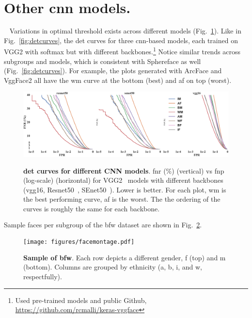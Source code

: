 %
\onecolumn
\renewcommand{\thesection}{\alph{section}}
\glsresetall
\setcounter{section}{0}

\section{Other \gls{cnn} models.}~\label{app:sec:other:models}
Variations in optimal threshold exists across different models (Fig.~\ref{fig:sdm-appendix-a}). Like in Fig.~\ref{fig:detcurves}, the \gls{det} curves for three \gls{cnn}-based models, each trained on VGG2 with softmax but with different backbones.\footnote{Used pre-trained models and public Github, \href{https://github.com/rcmalli/keras-vggface}{https://github.com/rcmalli/keras-vggface}} Notice similar trends across subgroups and models, which is consistent with  Sphereface as well (Fig.~\ref{fig:detcurves}). For example, the plots generated with ArcFace and VggFace2 all have the \gls{wm} curve at the bottom (\ie best) and \gls{af} on top (\ie worst).
\begin{figure}[h!]
\vspace{-2mm}
    \centering
    \includegraphics[width=.8\linewidth, trim={0mm 0mm 0mm 0mm},clip]{figures/SDM.pdf}\\
    \caption{\textbf{\gls{det} curves for different CNN models}. \gls{fnr} (\%) (vertical) vs \gls{fnp} (log-scale)  (horizontal) for VGG2~\cite{Cao18} models with different backbones (vgg16, Resnet50~\cite{he2016deep}, SEnet50~\cite{hu2018squeeze}). Lower is better. For each plot, \gls{wm} is the best performing curve, \gls{af} is the worst. The the ordering of the curves is roughly the same for each backbone.}\label{fig:sdm-appendix-a}
    \vspace{-3mm}
\end{figure}

Sample faces per subgroup of the \gls{bfw} dataset are shown in Fig.~\ref{fig:montage:app}.
\begin{figure}[h!]
\vspace{-2mm}
    \centering
    \texttt{[image: figures/facemontage.pdf]}
    \caption{\textbf{Sample of \gls{bfw}}. Each row depicts a different gender, \gls{f} (top) and \gls{m} (bottom). Columns are grouped by ethnicity (\ie \gls{a}, \gls{b}, \gls{i}, and \gls{w}, respectfully).}
    \label{fig:montage:app}
    \vspace{-3mm}
\end{figure}


